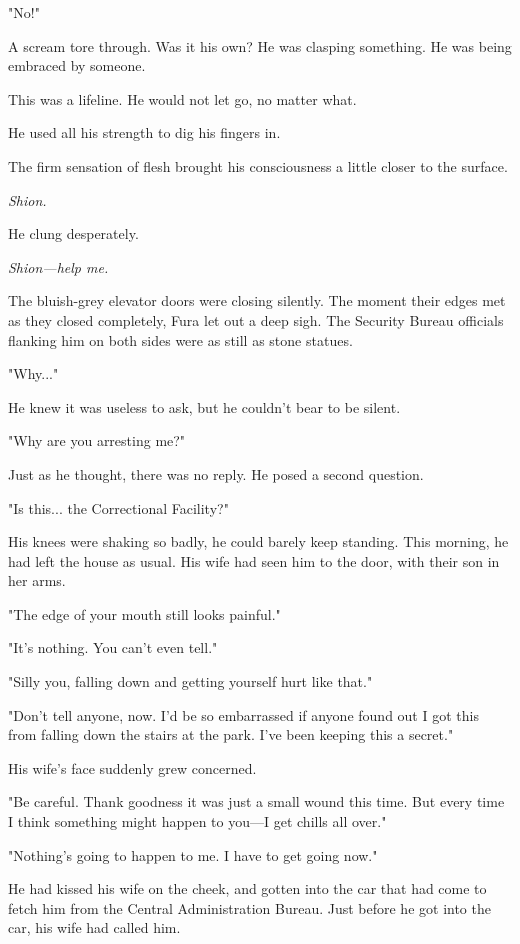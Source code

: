 "No!"

A scream tore through. Was it his own? He was clasping something. He was
being embraced by someone.

This was a lifeline. He would not let go, no matter what.

He used all his strength to dig his fingers in.

The firm sensation of flesh brought his consciousness a little closer to
the surface.

\emph{Shion.}

He clung desperately.

\emph{Shion---help me.}

\mybreak

The bluish-grey elevator doors were closing silently. The moment their
edges met as they closed completely, Fura let out a deep sigh. The
Security Bureau officials flanking him on both sides were as still as
stone statues.

"Why..."

He knew it was useless to ask, but he couldn't bear to be silent.

"Why are you arresting me?"

Just as he thought, there was no reply. He posed a second question.

"Is this... the Correctional Facility?"

His knees were shaking so badly, he could barely keep standing. This
morning, he had left the house as usual. His wife had seen him to the
door, with their son in her arms.

"The edge of your mouth still looks painful."

"It's nothing. You can't even tell."

"Silly you, falling down and getting yourself hurt like that."

"Don't tell anyone, now. I'd be so embarrassed if anyone found out I got
this from falling down the stairs at the park. I've been keeping this a
secret."

His wife's face suddenly grew concerned.

"Be careful. Thank goodness it was just a small wound this time. But
every time I think something might happen to you---I get chills all over."

"Nothing's going to happen to me. I have to get going now."

He had kissed his wife on the cheek, and gotten into the car that had
come to fetch him from the Central Administration Bureau. Just before he
got into the car, his wife had called him.

